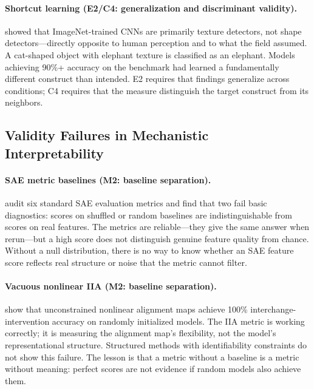 \documentclass{article}
\begin{document}
\paragraph{Shortcut learning (E2/C4: generalization and discriminant validity).}
\citet{geirhos2019imagenet} showed that ImageNet-trained CNNs are primarily texture detectors, not shape detectors---directly opposite to human perception and to what the field assumed. A cat-shaped object with elephant texture is classified as an elephant. Models achieving 90\%+ accuracy on the benchmark had learned a fundamentally different construct than intended. E2 requires that findings generalize across conditions; C4 requires that the measure distinguish the target construct from its neighbors.

\subsection{Validity Failures in Mechanistic Interpretability}
\label{sec:mi-failures}

\paragraph{SAE metric baselines (M2: baseline separation).}
\citet{karvonen2025saebench} audit six standard SAE evaluation metrics and find that two fail basic diagnostics: scores on shuffled or random baselines are indistinguishable from scores on real features. The metrics are reliable---they give the same answer when rerun---but a high score does not distinguish genuine feature quality from chance. Without a null distribution, there is no way to know whether an SAE feature score reflects real structure or noise that the metric cannot filter.

\paragraph{Vacuous nonlinear IIA (M2: baseline separation).}
\citet{sutter2025nonlinear} show that unconstrained nonlinear alignment maps achieve 100\% interchange-intervention accuracy on randomly initialized models. The IIA metric is working correctly; it is measuring the alignment map's flexibility, not the model's representational structure. Structured methods with identifiability constraints do not show this failure. The lesson is that a metric without a baseline is a metric without meaning: perfect scores are not evidence if random models also achieve them.
\end{document}
